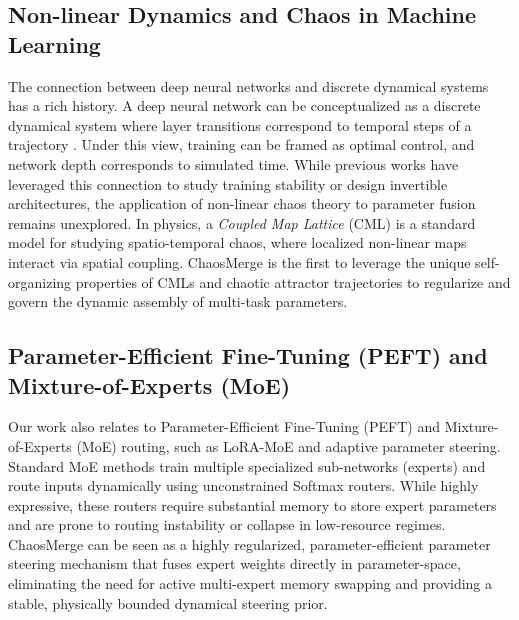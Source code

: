 \subsection{Non-linear Dynamics and Chaos in Machine Learning}
The connection between deep neural networks and discrete dynamical systems has a rich history. A deep neural network can be conceptualized as a discrete dynamical system where layer transitions correspond to temporal steps of a trajectory \cite{e2017proposal, haber2017stable}. Under this view, training can be framed as optimal control, and network depth corresponds to simulated time. While previous works have leveraged this connection to study training stability or design invertible architectures, the application of non-linear chaos theory to parameter fusion remains unexplored. 
In physics, a \emph{Coupled Map Lattice} (CML) \cite{kaneko1992coupled} is a standard model for studying spatio-temporal chaos, where localized non-linear maps interact via spatial coupling. ChaosMerge is the first to leverage the unique self-organizing properties of CMLs and chaotic attractor trajectories to regularize and govern the dynamic assembly of multi-task parameters.

\subsection{Parameter-Efficient Fine-Tuning (PEFT) and Mixture-of-Experts (MoE)}
Our work also relates to Parameter-Efficient Fine-Tuning (PEFT) and Mixture-of-Experts (MoE) routing, such as LoRA-MoE \cite{dou2023loramoe} and adaptive parameter steering. Standard MoE methods train multiple specialized sub-networks (experts) and route inputs dynamically using unconstrained Softmax routers. While highly expressive, these routers require substantial memory to store expert parameters and are prone to routing instability or collapse in low-resource regimes. ChaosMerge can be seen as a highly regularized, parameter-efficient parameter steering mechanism that fuses expert weights directly in parameter-space, eliminating the need for active multi-expert memory swapping and providing a stable, physically bounded dynamical steering prior.
